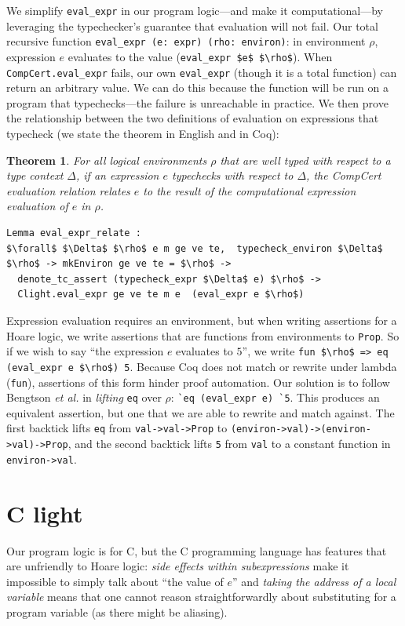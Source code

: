 \documentclass{puthesis}
\begin{document}
We simplify \lstinline|eval_expr| in our program logic---and make it
computational---by leveraging the typechecker's guarantee that
evaluation will not fail.  Our total recursive function
\lstinline|eval_expr (e: expr) (rho: environ)|: in environment $\rho$,
expression $e$ evaluates to the value 
(\lstinline|eval_expr $e$ $\rho$|).  When \lstinline{CompCert.eval_expr} fails, our own
\lstinline{eval_expr} (though it is a total function) can return an
arbitrary value.  We can do this because the function will be run on a
program that typechecks---the failure is unreachable in practice. We
then prove the relationship between the two definitions of evaluation
on expressions that typecheck (we state the theorem in English and in
Coq):
\newtheorem{eval_expr_relate}{Theorem}
\begin{eval_expr_relate}
For all logical environments $\rho$ that are well typed with respect to a type
context $\Delta$, if an expression $e$ typechecks with respect to $\Delta$, the
CompCert evaluation relation relates $e$ to the result of the computational
expression evaluation of $e$ in $\rho$. 
\end{eval_expr_relate}

\begin{lstlisting}
Lemma eval_expr_relate :
$\forall$ $\Delta$ $\rho$ e m ge ve te,  typecheck_environ $\Delta$ $\rho$ -> mkEnviron ge ve te = $\rho$ ->
  denote_tc_assert (typecheck_expr $\Delta$ e) $\rho$ ->
  Clight.eval_expr ge ve te m e  (eval_expr e $\rho$)
\end{lstlisting}

Expression evaluation requires an environment, but when writing
assertions for a Hoare logic, we write assertions that are
functions from environments to \lstinline|Prop|. So if we wish to say
``the expression $e$ evaluates to $5$'', we write 
\lstinline|fun $\rho$ => eq (eval_expr e $\rho$) 5|.  Because Coq does not match or
rewrite under lambda (\lstinline|fun|), assertions of this form hinder
proof automation.  Our solution is to follow Bengtson \emph{et al.}
\cite{bengtson12:Charge} in \emph{lifting} \lstinline|eq| over $\rho$:
\lstinline|`eq (eval_expr e) `5|.  This produces an equivalent
assertion, but one that we are able to rewrite and match against. The
first backtick lifts \lstinline|eq| from \lstinline{val->val->Prop} to
\lstinline{(environ->val)->(environ->val)->Prop}, and the second
backtick lifts \lstinline{5} from \lstinline{val} to a constant
function in \lstinline{environ->val}.


\section{C light}
\label{sec:clight}
Our program logic is for C, but the C programming language has features that are
unfriendly to Hoare logic: \emph{side effects within subexpressions} 
make it impossible to simply talk about ``the value of $e$''  and \emph{taking
the address of a local variable} means that one cannot reason straightforwardly about
substituting for a program variable
(as there might be aliasing).
\end{document}
